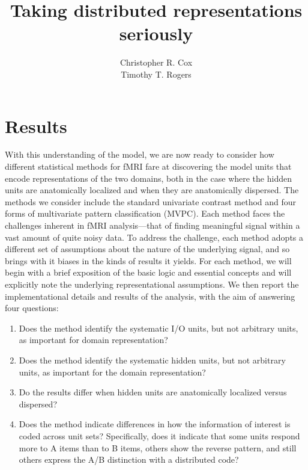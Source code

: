 \documentclass[12pt,man,draftfirst]{apa6}
\title{Taking distributed representations seriously}
\author{Christopher R. Cox\\Timothy T. Rogers}
\affiliation{University of Wisconsin, Madison}
\begin{document}
\maketitle







\section{Results}

With this understanding of the model, we are now ready to consider how different statistical methods for fMRI fare at discovering the model units that encode representations of the two domains, both in the case where the hidden units are anatomically localized and when they are anatomically dispersed. The methods we consider include the standard univariate contrast method and four forms of multivariate pattern classification (MVPC). Each method faces the challenges inherent in fMRI analysis---that of finding meaningful signal within a vast amount of quite noisy data. To address the challenge, each method adopts a different set of assumptions about the nature of the underlying signal, and so brings with it biases in the kinds of results it yields. For each method, we will begin with a brief exposition of the basic logic and essential concepts and will explicitly note the underlying representational assumptions. We then report the implementational details and results of the analysis, with the aim of answering four questions:

\begin{enumerate}
\item Does the method identify the systematic I/O units, but not arbitrary units, as important for domain representation?
\item Does the method identify the systematic hidden units, but not arbitrary units, as important for the domain representation?
\item Do the results differ when hidden units are anatomically localized versus dispersed?
\item Does the method indicate differences in how the information of interest is coded across unit sets? Specifically, does it indicate that some units respond more to A items than to B items, others show the reverse pattern, and still others express the A/B distinction with a distributed code? 
\end{enumerate}

















\end{document}

